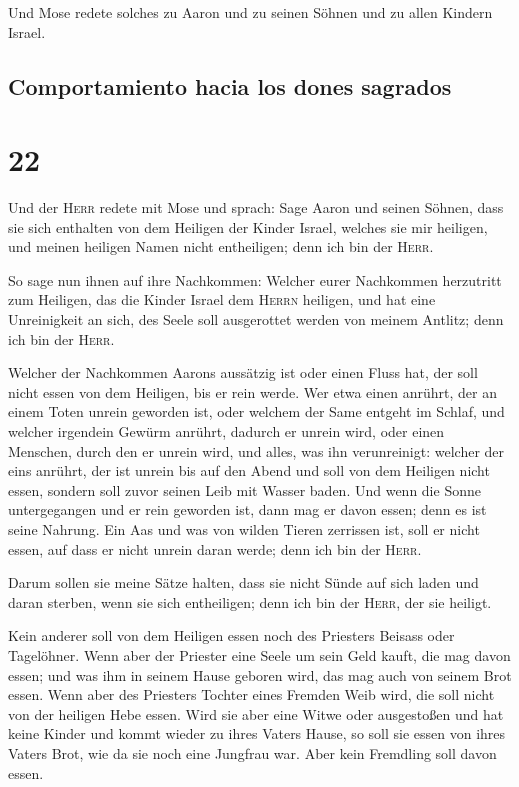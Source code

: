  Und Mose redete solches zu Aaron und zu seinen Söhnen
und zu allen Kindern Israel.

\hypertarget{comportamiento-hacia-los-dones-sagrados}{%
\subsection{Comportamiento hacia los dones
sagrados}\label{comportamiento-hacia-los-dones-sagrados}}

\hypertarget{section-21}{%
\section{22}\label{section-21}}

 Und der \textsc{Herr} redete mit Mose und sprach:
 Sage Aaron und seinen Söhnen, dass sie sich enthalten von
dem Heiligen der Kinder Israel, welches sie mir heiligen, und meinen
heiligen Namen nicht entheiligen; denn ich bin der \textsc{Herr}.

 So sage nun ihnen auf ihre Nachkommen: Welcher eurer
Nachkommen herzutritt zum Heiligen, das die Kinder Israel dem
\textsc{Herrn} heiligen, und hat eine Unreinigkeit an sich, des Seele
soll ausgerottet werden von meinem Antlitz; denn ich bin der
\textsc{Herr}.

 Welcher der Nachkommen Aarons aussätzig ist oder einen
Fluss hat, der soll nicht essen von dem Heiligen, bis er rein werde. Wer
etwa einen anrührt, der an einem Toten unrein geworden ist, oder welchem
der Same entgeht im Schlaf,  und welcher irgendein Gewürm
anrührt, dadurch er unrein wird, oder einen Menschen, durch den er
unrein wird, und alles, was ihn verunreinigt:  welcher der
eins anrührt, der ist unrein bis auf den Abend und soll von dem Heiligen
nicht essen, sondern soll zuvor seinen Leib mit Wasser baden.
 Und wenn die Sonne untergegangen und er rein geworden
ist, dann mag er davon essen; denn es ist seine Nahrung. 
Ein Aas und was von wilden Tieren zerrissen ist, soll er nicht essen,
auf dass er nicht unrein daran werde; denn ich bin der \textsc{Herr}.

 Darum sollen sie meine Sätze halten, dass sie nicht Sünde
auf sich laden und daran sterben, wenn sie sich entheiligen; denn ich
bin der \textsc{Herr}, der sie heiligt.

 Kein anderer soll von dem Heiligen essen noch des
Priesters Beisass oder Tagelöhner.  Wenn aber der
Priester eine Seele um sein Geld kauft, die mag davon essen; und was ihm
in seinem Hause geboren wird, das mag auch von seinem Brot essen.
 Wenn aber des Priesters Tochter eines Fremden Weib wird,
die soll nicht von der heiligen Hebe essen.  Wird sie
aber eine Witwe oder ausgestoßen und hat keine Kinder und kommt wieder
zu ihres Vaters Hause, so soll sie essen von ihres Vaters Brot, wie da
sie noch eine Jungfrau war. Aber kein Fremdling soll davon essen.

